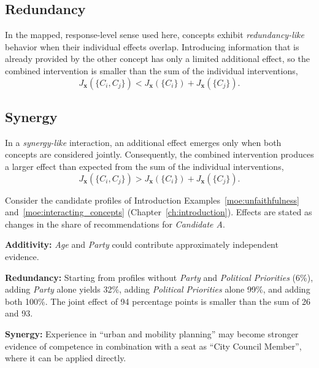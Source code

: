 \subsection{Redundancy}
In the mapped, response-level sense used here, concepts exhibit \emph{redundancy-like} behavior when their individual effects overlap. Introducing information that is already provided by the other concept has only a limited additional effect, so the combined intervention is smaller than the sum of the individual interventions,
\begin{equation}
	J_{\mathbf{x}}(\{C_i,C_j\}) < J_{\mathbf{x}}(\{C_i\})+J_{\mathbf{x}}(\{C_j\}).
\end{equation}

\subsection{Synergy}
In a \emph{synergy-like} interaction, an additional effect emerges only when both concepts are considered jointly. Consequently, the combined intervention produces a larger effect than expected from the sum of the individual interventions,
\begin{equation}
	J_{\mathbf{x}}(\{C_i,C_j\}) > J_{\mathbf{x}}(\{C_i\})+J_{\mathbf{x}}(\{C_j\}).
\end{equation}

\begin{example_box}[label=ex:interaction_directions]
	Consider the candidate profiles of Introduction Examples~\ref{moe:unfaithfulness} and~\ref{moe:interacting_concepts} (Chapter~\ref{ch:introduction}). Effects are stated as changes in the share of recommendations for \textit{Candidate A}.

	\smallskip
	\textbf{Additivity:} \textit{Age} and \textit{Party} could contribute approximately independent evidence.

	\smallskip
	\textbf{Redundancy:} Starting from profiles without \textit{Party} and \textit{Political Priorities} (6\%), adding \textit{Party} alone yields 32\%, adding \textit{Political Priorities} alone 99\%, and adding both 100\%. The joint effect of 94 percentage points is smaller than the sum of 26 and 93.

	\smallskip
	\textbf{Synergy:} Experience in \enquote{urban and mobility planning} may become stronger evidence of competence in combination with a seat as \enquote{City Council Member}, where it can be applied directly.
\end{example_box}

